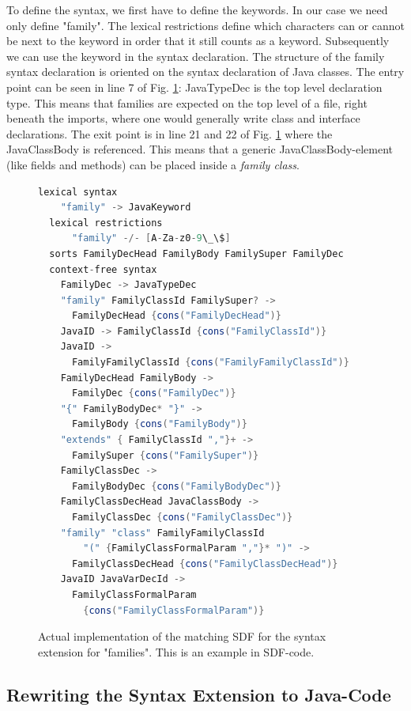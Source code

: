 \documentclass{report}
\begin{document}
To define the syntax, we first have to define the keywords. In our case we need only define "family". The lexical restrictions define which characters can or cannot be next to the keyword in order that it still counts as a keyword. Subsequently we can use the keyword in the syntax declaration. The structure of the family syntax declaration is oriented on the syntax declaration of Java classes. The entry point can be seen in line 7 of Fig. \ref{sdfFamilies}: JavaTypeDec is the top level declaration type. This means that families are expected on the top level of a file, right beneath the imports, where one would generally write class and interface declarations. The exit point is in line 21 and 22 of Fig. \ref{sdfFamilies} where the JavaClassBody is referenced. This means that a generic JavaClassBody-element (like fields and methods) can be placed inside a \emph{family class}.

\begin{figure}[H]
\begin{lstlisting}[language=java,breaklines=false]
  lexical syntax
    "family" -> JavaKeyword
  lexical restrictions
  	  "family" -/- [A-Za-z0-9\_\$] 
  sorts FamilyDecHead FamilyBody FamilySuper FamilyDec
  context-free syntax
    FamilyDec -> JavaTypeDec
    "family" FamilyClassId FamilySuper? ->
      FamilyDecHead {cons("FamilyDecHead")}
    JavaID -> FamilyClassId {cons("FamilyClassId")}
    JavaID -> 
      FamilyFamilyClassId {cons("FamilyFamilyClassId")}
    FamilyDecHead FamilyBody ->
      FamilyDec {cons("FamilyDec")}
    "{" FamilyBodyDec* "}" ->
      FamilyBody {cons("FamilyBody")}
    "extends" { FamilyClassId ","}+ ->
      FamilySuper {cons("FamilySuper")}
    FamilyClassDec ->
      FamilyBodyDec {cons("FamilyBodyDec")}
    FamilyClassDecHead JavaClassBody ->
      FamilyClassDec {cons("FamilyClassDec")}
    "family" "class" FamilyFamilyClassId
        "(" {FamilyClassFormalParam ","}* ")" ->
      FamilyClassDecHead {cons("FamilyClassDecHead")}
    JavaID JavaVarDecId ->
      FamilyClassFormalParam
        {cons("FamilyClassFormalParam")}
\end{lstlisting}
\caption{Actual implementation of the matching SDF for the syntax extension for "families". This is an example in SDF-code.}
\label{sdfFamilies}
\end{figure}


\subsection{Rewriting the Syntax Extension to Java-Code}
\end{document}

